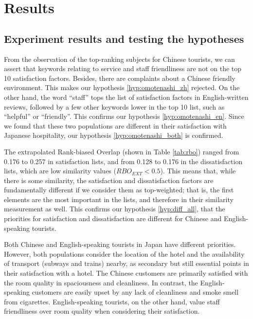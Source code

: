 \documentclass[smallextended,natbib]{svjour3}       %
\begin{document}
\section{Results}\label{results}

\subsection{Experiment results and testing the hypotheses}

From the observation of the top-ranking subjects for Chinese tourists, we can assert that keywords relating to service and staff friendliness are not on the top 10 satisfaction factors. Besides, there are complaints about a Chinese friendly environment. This makes our hypothesis \ref{hyp:omotenashi_zh} rejected. On the other hand, the word ``staff'' tops the list of satisfaction factors in English-written reviews, followed by a few other keywords lower in the top 10 list, such as ``helpful'' or ``friendly''. This confirms our hypothesis \ref{hyp:omotenashi_en}. Since we found that these two populations are different in their satisfaction with Japanese hospitality, our hypothesis \ref{hyp:omotenashi_both} is confirmed.

The extrapolated Rank-biased Overlap (shown in Table \ref{tab:rbo}) ranged from 0.176 to 0.257 in satisfaction lists, and from 0.128 to 0.176 in the dissatisfaction lists, which are low similarity values (\(RBO_{EXT} < 0.5\)). This means that, while there is some similarity, the satisfaction and dissatisfaction factors are fundamentally different if we consider them as top-weighted; that is, the first elements are the most important in the lists, and therefore in their similarity measurement as well. This confirms our hypothesis \ref{hyp:diff_all}, that the priorities for satisfaction and dissatisfaction are different for Chinese and English-speaking tourists. 

Both Chinese and English-speaking tourists in Japan have different priorities. However, both populations consider the location of the hotel and the availability of transport (subways and trains) nearby, as secondary but still essential points in their satisfaction with a hotel. The Chinese customers are primarily satisfied with the room quality in spaciousness and cleanliness. In contrast, the English-speaking customers are easily upset by any lack of cleanliness and smoke smell from cigarettes. English-speaking tourists, on the other hand, value staff friendliness over room quality when considering their satisfaction. 
\end{document}
